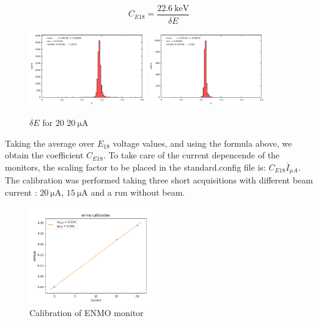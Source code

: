 \begin{equation*}
C_{E18} = \frac{\SI{22.6}{\kilo \electronvolt}}{\overline{\delta E}}
\end{equation*}

\begin{figure}[hbtp]
\centering
\includegraphics[width = 0.45\textwidth]{Analysis/ENMOvoltage20.pdf}
\includegraphics[width = 0.45\textwidth]{Analysis/ENMOvoltage15.pdf} 
\caption{$\delta E$ for 20 $\SI{20}{\micro \ampere}$}
\end{figure}

Taking the average over $E_{18}$ voltage values, and using the formula above, we obtain the coefficient $C_{E18}$. To take care of the current depencende of the monitors, the scaling factor to be placed in the standard.config file is: $C_{E18} \overline{I}_{\mu A}$.
The calibration was performed taking three short acquisitions with different beam current : $\SI{20}{\micro \ampere}$, $\SI{15}{\micro \ampere}$ and a run without beam. 

\begin{figure}[hbtp]
\centering
\includegraphics[width = 0.5\textwidth]{Analysis/E18_Calibration.png}
\caption{Calibration of ENMO monitor}
\end{figure}

